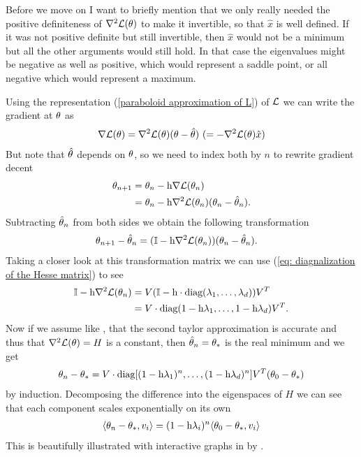 Before we move on I want to briefly mention that we only really needed the
positive definiteness of \(\nabla^2 \mathcal{L}(\theta)\) to make it invertible, so that
\(\hat{x}\) is well defined. If it was not positive definite but still invertible,
then \(\hat{x}\) would not be a minimum but all the other arguments would still
hold.
In that case the eigenvalues might be negative as well as positive, which would
represent a saddle point, or all negative which would represent a maximum.

Using the representation (\ref{paraboloid approximation of L}) of \(\mathcal{L}\) we
can write the gradient at \(\theta\) as
%
\begin{align}\label{eq: hesse representation of gradient}
	\nabla \mathcal{L}(\theta)
	=  \nabla^2 \mathcal{L}(\theta)(\theta-\hat{\theta})
	\ (= -\nabla^2 \mathcal{L}(\theta)\hat{x})
\end{align}
%
But note that \(\hat{\theta}\) depends on \(\theta\), so we need to index both
by \(n\) to rewrite gradient decent
%
\begin{align*}
	\theta_{n+1} &= \theta_n - \text{h}\nabla \mathcal{L}(\theta_n)\\
	&= \theta_n - \text{h}\nabla^2 \mathcal{L}(\theta_n)(\theta_n - \hat{\theta}_n).
\end{align*}
%
Subtracting \(\hat{\theta}_n\) from both sides we obtain the following
transformation 
%
\begin{align}\label{eq: Matrix GD Formulation}
	\theta_{n+1} - \hat{\theta}_n
	&= (\mathbb{I} - \text{h}\nabla^2 \mathcal{L}(\theta_n) ) (\theta_n - \hat{\theta}_n).
\end{align}
%
Taking a closer look at this transformation matrix we can use (\ref{eq:
diagnalization of the Hesse matrix}) to see
%
\begin{align*}
	\mathbb{I} - \text{h}\nabla^2 \mathcal{L}(\theta_n)
	&= V(\mathbb{I} - \text{h}\cdot\text{diag}(\lambda_1,\dots,\lambda_d) )V^T \\
	&= V\cdot\text{diag}(1-\text{h}\lambda_1, \dots,1-\text{h}\lambda_d)V^T.
\end{align*}
%
Now if we assume like \textcite{gohWhyMomentumReally2017}, that the second
taylor approximation is accurate and thus that \(\nabla^2 \mathcal{L}(\theta)=H\) is a
constant, then \(\hat{\theta}_n = \theta_*\) is the real minimum and we get
%
\begin{align}
	\theta_n - \theta_*
	= V\cdot\text{diag}[(1-\text{h}\lambda_1)^n,\dots,(1-\text{h}\lambda_d)^n] V^T (\theta_0 - \theta_*)
\end{align}
%
by induction. Decomposing the difference into the eigenspaces of \(H\) we can 
see that each component scales exponentially on its own 
%
\begin{align*}
	\langle \theta_n -\theta_*, v_i\rangle
	= (1-\text{h}\lambda_i)^n \langle \theta_0 - \theta_*, v_i\rangle
\end{align*}
%
This is beautifully illustrated with interactive graphs in
 by \citeauthor{gohWhyMomentumReally2017}.

